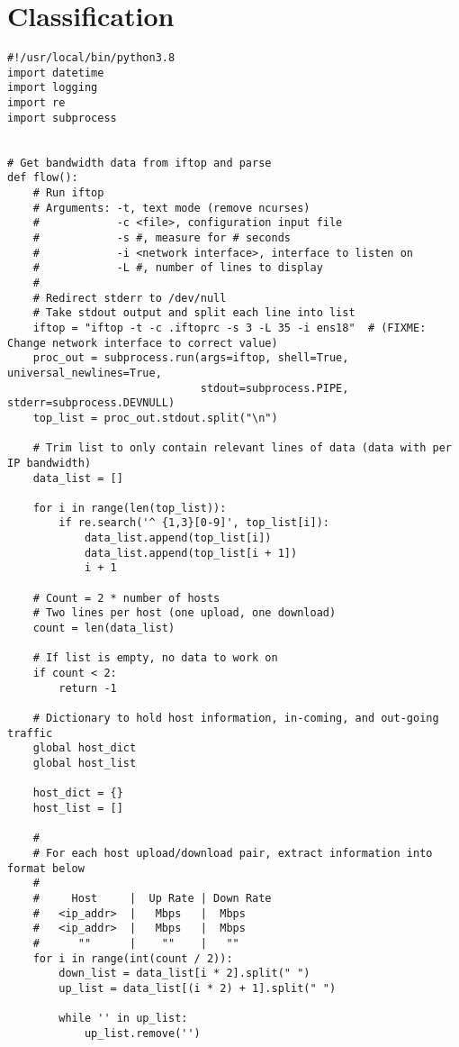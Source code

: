 \section{Classification}
\begin{verbatim}
#!/usr/local/bin/python3.8
import datetime
import logging
import re
import subprocess


# Get bandwidth data from iftop and parse
def flow():
    # Run iftop
    # Arguments: -t, text mode (remove ncurses)
    #            -c <file>, configuration input file
    #            -s #, measure for # seconds
    #            -i <network interface>, interface to listen on
    #            -L #, number of lines to display
    #
    # Redirect stderr to /dev/null
    # Take stdout output and split each line into list
    iftop = "iftop -t -c .iftoprc -s 3 -L 35 -i ens18"  # (FIXME: Change network interface to correct value)
    proc_out = subprocess.run(args=iftop, shell=True, universal_newlines=True,
                              stdout=subprocess.PIPE, stderr=subprocess.DEVNULL)
    top_list = proc_out.stdout.split("\n")

    # Trim list to only contain relevant lines of data (data with per IP bandwidth)
    data_list = []

    for i in range(len(top_list)):
        if re.search('^ {1,3}[0-9]', top_list[i]):
            data_list.append(top_list[i])
            data_list.append(top_list[i + 1])
            i + 1

    # Count = 2 * number of hosts
    # Two lines per host (one upload, one download)
    count = len(data_list)

    # If list is empty, no data to work on
    if count < 2:
        return -1

    # Dictionary to hold host information, in-coming, and out-going traffic
    global host_dict
    global host_list

    host_dict = {}
    host_list = []

    #
    # For each host upload/download pair, extract information into format below
    #
    #     Host     |  Up Rate | Down Rate
    #   <ip_addr>  |   Mbps   |  Mbps
    #   <ip_addr>  |   Mbps   |  Mbps
    #      ""      |    ""    |   ""
    for i in range(int(count / 2)):
        down_list = data_list[i * 2].split(" ")
        up_list = data_list[(i * 2) + 1].split(" ")

        while '' in up_list:
            up_list.remove('')


\end{verbatim}

